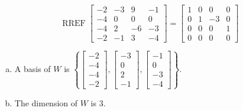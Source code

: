 \begin{exerciseAnswer} 


\[\operatorname{RREF} \left[\begin{array}{cccc}
-2 & -3 & 9 & -1 \\
-4 & 0 & 0 & 0 \\
-4 & 2 & -6 & -3 \\
-2 & -1 & 3 & -4
\end{array}\right] = \left[\begin{array}{cccc}
1 & 0 & 0 & 0 \\
0 & 1 & -3 & 0 \\
0 & 0 & 0 & 1 \\
0 & 0 & 0 & 0
\end{array}\right] \]


\begin{enumerate}[(a)]
\item A basis of \(W\) is \( \left\{ \left[\begin{array}{c}
-2 \\
-4 \\
-4 \\
-2
\end{array}\right] , \left[\begin{array}{c}
-3 \\
0 \\
2 \\
-1
\end{array}\right] , \left[\begin{array}{c}
-1 \\
0 \\
-3 \\
-4
\end{array}\right] \right\} \).
\item The dimension of \(W\) is \( 3 \).
\end{enumerate}
    
\end{exerciseAnswer}
    
